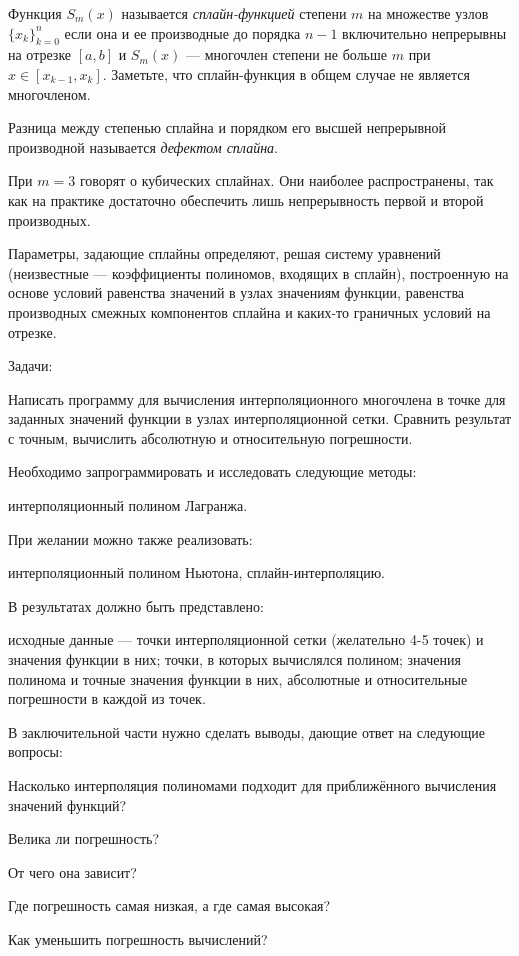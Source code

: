 Функция $S_{m}(x)$ называется
\emph{сплайн-функцией} степени $m$ на множестве
узлов $\{x_{k}\}_{k=0}^{n}$ если она и ее производные до порядка $n-1$
включительно непрерывны на отрезке $[a,b]$ и $S_{m}(x)$ --- многочлен
степени не больше $m$ при $x\in[x_{k-1},x_{k}]$.  Заметьте, что
сплайн-функция в общем случае не является многочленом.

Разница между степенью сплайна и порядком его высшей непрерывной производной
называется \emph{дефектом сплайна}.

При $m=3$ говорят о кубических сплайнах. Они наиболее распространены,
так как на практике достаточно обеспечить лишь непрерывность первой и
второй производных.

Параметры, задающие сплайны определяют, решая систему уравнений
(неизвестные --- коэффициенты полиномов, входящих в сплайн),
построенную на основе условий равенства значений в узлах значениям
функции, равенства производных смежных компонентов сплайна и каких-то
граничных условий на отрезке.

Задачи:

Написать программу для вычисления интерполяционного многочлена в точке
для заданных значений функции в узлах интерполяционной сетки. Сравнить
результат с точным, вычислить абсолютную и относительную погрешности.

Необходимо запрограммировать и исследовать следующие методы:

интерполяционный полином Лагранжа.

При желании можно также реализовать:

интерполяционный полином Ньютона, сплайн-интерполяцию.

В результатах должно быть представлено:

исходные данные — точки интерполяционной сетки (желательно 4-5 точек)
и значения функции в них; точки, в которых вычислялся полином; значения
полинома и точные значения функции в них, абсолютные и относительные
погрешности в каждой из точек.

В заключительной части нужно сделать выводы, дающие ответ на следующие
вопросы:

Насколько интерполяция полиномами подходит для приближённого
вычисления значений функций?

Велика ли погрешность?

От чего она зависит?

Где погрешность самая низкая, а где самая высокая?

Как уменьшить погрешность вычислений?

